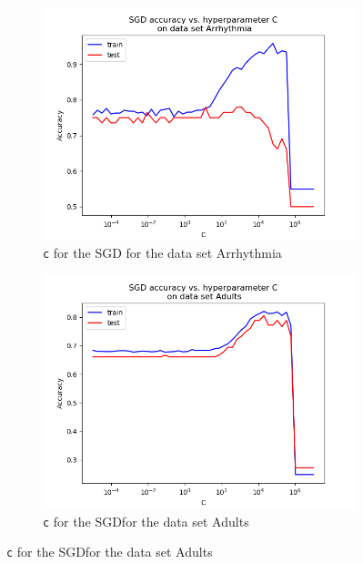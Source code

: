 \documentclass{article}
\begin{document}
\begin{figure}[H]
	\centering
	\begin{subfigure}[t]{0.45\linewidth}
		\includegraphics[width=\linewidth]{figs/hyperparams/arrhythmia_sgd_c.png}
		\caption{\texttt{c} for the SGD for the data set Arrhythmia}
	\end{subfigure}
	\begin{subfigure}[t]{0.45\linewidth}
		\includegraphics[width=\linewidth]{figs/hyperparams/adults_sgd_c.png}
		\caption{\texttt{c} for the SGDfor the data set Adults}
	\end{subfigure}


\end{figure}
\end{document}
